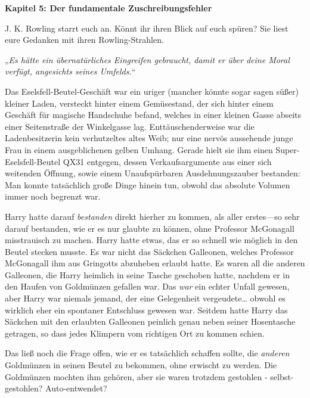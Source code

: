 

\hypertarget{der-fundamentale-zuschreibungsfehler}{%

\textbf{Kapitel 5: Der fundamentale Zuschreibungsfehler}

J. K. Rowling starrt euch an. Könnt ihr ihren Blick auf euch spüren? Sie liest eure Gedanken mit ihren Rowling-Strahlen.

\later

„\emph{Es hätte ein übernatürliches Eingreifen gebraucht, damit er über deine Moral verfügt, angesichts seines Umfelds.}“

\later

Das Eselsfell-Beutel-Geschäft war ein uriger (mancher könnte sogar sagen süßer) kleiner Laden, versteckt hinter einem Gemüsestand, der sich hinter einem Geschäft für magische Handschuhe befand, welches in einer kleinen Gasse abseits einer Seitenstraße der Winkelgasse lag. Enttäuschenderweise war die Ladenbesitzerin kein verhutzeltes altes Weib; nur eine nervös aussehende junge Frau in einem ausgeblichenen gelben Umhang. Gerade hielt sie ihm einen Super-Eselsfell-Beutel QX31 entgegen, dessen Verkaufsargumente aus einer sich weitenden Öffnung, sowie einem Unaufspürbaren Ausdehnungszauber bestanden: Man konnte tatsächlich große Dinge hinein tun, obwohl das absolute Volumen immer noch begrenzt war.

Harry hatte darauf \emph{bestanden} direkt hierher zu kommen, als aller erstes—so sehr darauf bestanden, wie er es nur glaubte zu können, ohne Professor McGonagall misstrauisch zu machen. Harry hatte etwas, das er so schnell wie möglich in den Beutel stecken musste. Es war nicht das Säckchen Galleonen, welches Professor McGonagall ihm aus Gringotts abzuheben erlaubt hatte. Es waren all die anderen Galleonen, die Harry heimlich in seine Tasche geschoben hatte, nachdem er in den Haufen von Goldmünzen gefallen war. Das \emph{war} ein echter Unfall gewesen, aber Harry war niemals jemand, der eine Gelegenheit vergeudete… obwohl es wirklich eher ein spontaner Entschluss gewesen war. Seitdem hatte Harry das Säckchen mit den erlaubten Galleonen peinlich genau neben seiner Hosentasche getragen, so dass jedes Klimpern vom richtigen Ort zu kommen schien.

Das ließ noch die Frage offen, wie er es tatsächlich schaffen sollte, die \emph{anderen} Goldmünzen in seinen Beutel zu bekommen, ohne erwischt zu werden. Die Goldmünzen mochten ihm gehören, aber sie waren trotzdem gestohlen - selbst-gestohlen? Auto-entwendet?

}
